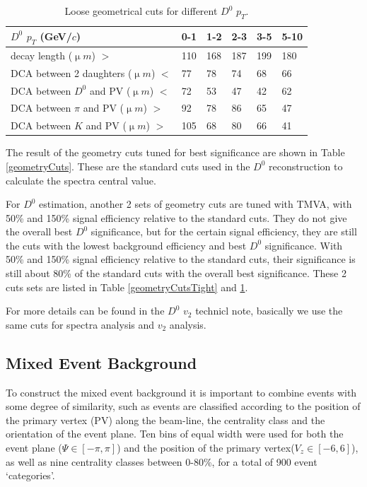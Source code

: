 \documentclass[a4paper]{article}
\begin{document}
\begin{table}[htp]
  \centering
  \caption{Loose geometrical cuts for different $D^0$ $p_T$.}
  \label{geometryCutsLoose}
  \begin{center}
    \begin{tabular}{l|l|l|l|l|l}
      $D^0$ $p_T$ (GeV/$c$) & 0-1 & 1-2 & 2-3 & 3-5 & 5-10\\ \hline
      decay length (${\upmu}m$) $>$ & 110 & 168 & 187 & 199 & 180\\ \hline
      DCA between 2 daughters (${\upmu}m$) $<$ & 77 & 78 & 74 & 68 & 66\\ \hline
      DCA between $D^0$ and PV (${\upmu}m$) $<$ & 72 & 53 & 47 & 42 & 62\\ \hline
      DCA between $\pi$ and PV (${\upmu}m$) $>$ & 92 & 78 & 86 & 65 & 47\\ \hline
      DCA between $K$ and PV (${\upmu}m$) $>$ & 105 & 68 & 80 & 66 & 41\\ \hline
    \end{tabular}
  \end{center}
\end{table}

The result of the geometry cuts tuned for best significance are shown in Table \ref{geometryCuts}. These are the standard cuts used in the $D^0$ reconstruction to calculate the spectra central value.

For $D^0$ estimation, another 2 sets of geometry cuts are tuned with TMVA, with 50\% and 150\% signal efficiency relative to the standard cuts. They do not give the overall best $D^0$ significance, but for the certain signal efficiency, they are still the cuts with the lowest background efficiency and best $D^0$ significance. With 50\% and 150\% signal efficiency relative to the standard cuts, their significance is still about 80\% of the standard cuts with the overall best significance. These 2 cuts sets are listed in Table \ref{geometryCutsTight} and \ref{geometryCutsLoose}.

For more details can be found in the $D^0$ $v_2$ technicl note, basically we use the same cuts for spectra analysis and $v_2$ analysis.

\subsection{Mixed Event Background}

To construct the mixed event background it is important to combine events with some degree of similarity, such as events are classified according to the position of the primary vertex (PV) along the beam-line, the centrality class and the orientation of the event plane. Ten bins of equal width were used for both the event plane ($\Psi\in[-\pi,\pi]$) and the position of the primary vertex($V_z\in[-6,6]$), as well as nine centrality classes between 0-80\%, for a total of 900 event `categories'.
\end{document}
